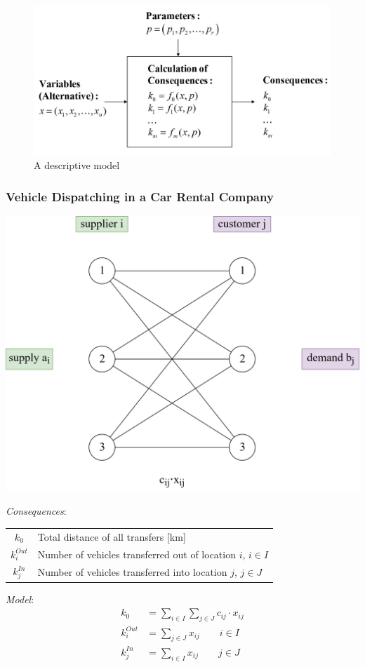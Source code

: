 \documentclass[11pt]{article}
\begin{document}
\begin{figure}
	\centering
	\includegraphics[width=0.8\linewidth,keepaspectratio]{img/descriptive_models}
	\caption{A descriptive model}
	\label{fig:descriptivemodels}
\end{figure}

\subsubsection{Vehicle Dispatching in a Car Rental Company}
\begin{minipage}{0.3\linewidth}
	\centering
	\includegraphics[width=\linewidth,keepaspectratio]{vehicle_dispatch}
\end{minipage}
\begin{minipage}{0.7\linewidth}
	\emph{Consequences}:
	
	\begin{tabularx}{\linewidth}{cX}
		$k_0$ & Total distance of all transfers [km]\\
		$k_i^{Out}$ & Number of vehicles transferred out of location $i$, $i\in I$\\
		$k_j^{In}$ & Number of vehicles transferred into location $j$, $j\in J$
	\end{tabularx}
	\vspace{1em}
	
	\noindent
	\emph{Model}:
	\begin{align*}
		k_0 &= \sum_{i\in I}\sum_{j\in J} c_{ij}\cdot x_{ij}\\
		k_i^{Out} &= \sum_{j\in J}x_{ij}\qquad i\in I \\
		k_j^{In} &= \sum_{i\in I}x_{ij}\qquad j\in J
	\end{align*}
\end{minipage}
\end{document}
